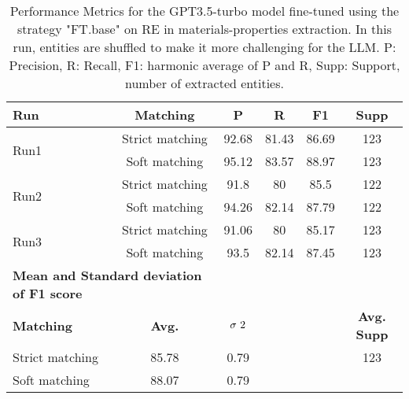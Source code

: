 \begin{table}[htbp]
    \small
    \centering
    \caption{Performance Metrics for the GPT3.5-turbo model fine-tuned using the strategy "FT.base" on RE in materials-properties extraction. In this run, entities are shuffled to make it more challenging for the LLM. P: Precision, R: Recall, F1: harmonic average of P and R, Supp: Support, number of extracted entities.}
    \begin{tabular}{lccccc}
        \toprule
        \textbf{Run} & \textbf{Matching} & \textbf{P} & \textbf{R} & \textbf{F1} & \textbf{Supp} \\
        \midrule
        \multirow{2}{*}{Run1} & Strict matching & 92.68 & 81.43 & 86.69 & 123 \\
        & Soft matching & 95.12 & 83.57 & 88.97 & 123 \\
        \midrule
        \multirow{2}{*}{Run2} & Strict matching & 91.8 & 80 & 85.5 & 122 \\
        & Soft matching & 94.26 & 82.14 & 87.79 & 122 \\
        \midrule
        \multirow{2}{*}{Run3} & Strict matching & 91.06 & 80 & 85.17 & 123 \\
        & Soft matching & 93.5 & 82.14 & 87.45 & 123 \\
        \midrule
        \multicolumn{2}{l}{\textbf{Mean and Standard deviation of F1 score}} & & & & \\
        \midrule
        \textbf{Matching} & \textbf{Avg.} & $\sigma\textsuperscript{2}$ & & &  \textbf{Avg. Supp}\\
        Strict matching & 85.78 & 0.79 & & & 123 \\
        Soft matching & 88.07 & 0.79 & & \\
        \bottomrule
    \end{tabular}
\end{table}


